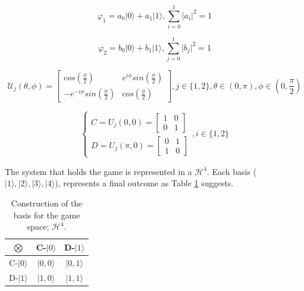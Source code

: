 \begin{equation}
\varphi_{1}=a_{0}\vert0\rangle+a_{1}\vert1\rangle,\sum_{i=0}^{1}\vert a_{i}\vert^{2}=1
\label{eq:quantum_prisioner_m1}
\end{equation}


\begin{equation}
\varphi_{2}=b_{0}\vert0\rangle+b_{1}\vert1\rangle,\sum_{j=0}^{1}\vert b_{j}\vert^{2}=1
\label{eq:quantum_prisioner_m2}
\end{equation}

\begin{equation}
\mathcal{U}_{j} ( \theta,\phi) = \left[\begin{array}{cc}
cos(\frac{\phi}{2}) & e^{i\phi}sin(\frac{\phi}{2})\\
-e^{-i\phi}sin(\frac{\phi}{2}) & cos(\frac{\phi}{2})
\end{array}\right] , j \in \{ 1, 2\}, \theta \in ( 0, \pi ) , \phi \in ( 0, \frac{\pi}{2})
\label{eq:operators_prisioneiros_quanticos}
\end{equation}

\begin{equation}
\begin{cases}C= 
U_{j}(0, 0)=\left[\begin{array}{cc}
1 & 0\\
0 & 1
\end{array}\right]\\
D= U_{j}(\pi, 0)=\left[\begin{array}{cc}
0 & 1\\
1 & 0
\end{array}\right]
\end{cases} , i \in \{ 1, 2 \}
\label{eq:operators_prisioneiros_quanticosmiaurons}
\end{equation}

The system that holds the game is represented in a $\mathcal{H}^{4}$. Each basis ($\vert 1\rangle, \vert 2\rangle, \vert 3\rangle, \vert 4\rangle$), represents a final outcome as Table \ref{tab:prisioners_m} suggests.

\begin{table}
\begin{centering}
\begin{tabular}{ccc}
\hline 
$\bigotimes$ & C-$\vert 0\rangle$ & D-$\vert 1\rangle$\tabularnewline
\hline 
C-$\vert 0\rangle$ & $\vert 0,0\rangle$ & $\vert 0,1\rangle$\tabularnewline
D-$\vert 1\rangle$ & $\vert 1,0\rangle$ & $\vert 1,1\rangle$\tabularnewline
\hline 
\end{tabular}
\par\end{centering}

\caption{Construction of the basis for the game space; $\mathcal{H}^{4}$.}
\label{tab:prisioners_m}
\end{table}



